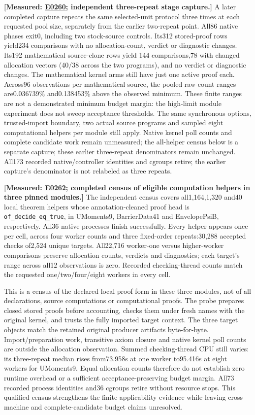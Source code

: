 \documentclass[10pt,twocolumn]{article}
\newcommand{\measured}[1]{\textbf{[Measured: #1]}}
\newcommand{\expref}[2]{\href{https://github.com/yunwei37/proofserve/blob/main/docs/tmp/build-and-evaluate/step-#1/step-report.md}{E#2}}
\begin{document}
\measured{\expref{0260-20261102T020415+0000}{0260}; independent three-repeat stage capture.}
A later completed capture repeats the same selected-unit protocol three
times at each requested pool size, separately from the earlier two-repeat
point. All86 native phases exit0, including two stock-source controls.
Its312 stored-proof rows yield234 comparisons with no allocation-count,
verdict or diagnostic changes. Its192 mathematical source-clone rows yield
144 comparisons,78 with changed allocation vectors (40/38 across the two
programs), and no verdict or diagnostic changes.
The mathematical kernel arms still have just one active proof each.
Across96 observations per mathematical source, the pooled raw-count ranges
are0.036739\% and0.138453\% above the observed minimum.
These finite ranges are not a demonstrated minimum budget margin:
the high-limit module experiment does not sweep acceptance thresholds.
The same synchronous options, trusted-import boundary, two actual source
programs and sampled eight computational helpers per module still apply.
Native kernel poll counts and complete candidate work remain unmeasured;
the all-helper census below is a separate capture; these earlier
three-repeat denominators remain unchanged.
All173 recorded native/controller identities and cgroups retire;
the earlier capture's denominator is not relabeled as three repeats.


\measured{\expref{0262-20261102T030442+0000}{0262}; completed census of eligible computation helpers in three pinned modules.}
The independent census covers all1,164,1,320 and40 local theorem helpers
whose annotation-cleaned proof head is \texttt{of\_decide\_eq\_true},
in UMoments9, BarrierData41 and EnvelopePsiB, respectively.
All36 native processes finish successfully.
Every helper appears once per cell, across four worker counts and three
fixed-order repeats:30,288 accepted checks of2,524 unique targets.
All22,716 worker-one versus higher-worker comparisons preserve allocation
counts, verdicts and diagnostics; each target's range across all12
observations is zero. Recorded checking-thread counts match the requested
one/two/four/eight workers in every cell.

This is a census of the declared local proof form in these three modules,
not of all declarations, source computations or computational proofs.
The probe prepares closed stored proofs before accounting, checks them under
fresh names with the original kernel, and trusts the fully imported target
context. The three target objects match the retained original producer
artifacts byte-for-byte. Import/preparation work, transitive axiom closure
and native kernel poll counts are outside the allocation observation.
Summed checking-thread CPU still varies: its three-repeat median rises
from73.958s at one worker to95.416s at eight workers for UMoments9.
Equal allocation counts therefore do not establish zero runtime overhead
or a sufficient acceptance-preserving budget margin.
All73 recorded process identities and36 cgroups retire without resource
stops. This qualified census strengthens the finite applicability evidence
while leaving cross-machine and complete-candidate budget claims unresolved.
\end{document}
